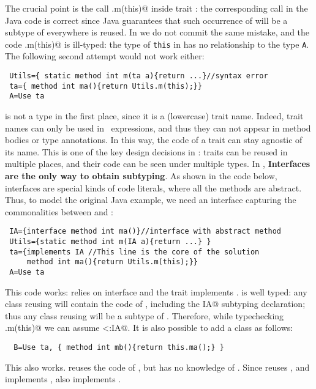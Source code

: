 The crucial point is the call \Q@Utils.m(this)@ inside trait \Q@ta@:
the corresponding call in the Java code is correct since Java guarantees that such occurrence of \Q@this@ will be a subtype of \Q@A@ everywhere is reused.
In \name we do not commit the same mistake, and the code \Q@Utils.m(this)@ is ill-typed:
the type of \lstinline{this} in
\Q@ta@ has no relationship to the type \lstinline{A}.
The following second attempt would not work either:
\saveSpace\saveSpace
\begin{lstlisting}
 Utils={ static method int m(ta a){return ...}//syntax error
 ta={ method int ma(){return Utils.m(this);}}
 A=Use ta
\end{lstlisting}
\saveSpace\saveSpace
\Q@ta@ is not a type in the first place, since it is a (lowercase) trait name.
Indeed, trait names can only be used in \use\ expressions, and thus they can not appear in method bodies or type annotations.
In this way, the code of a trait can stay agnostic of its name. This is one of the key design decisions in \name:
traits can be reused in multiple places, and their code can be seen under multiple types.
In \name, \textbf{Interfaces are the only way to obtain subtyping}. As shown in the code below, interfaces are special kinds of code literals, where all the methods are abstract.
Thus, to model the original Java example, we need an interface
capturing the commonalities between \Q@A@ and \Q@B@:
\saveSpace\saveSpace
\begin{lstlisting}
 IA={interface method int ma()}//interface with abstract method
 Utils={static method int m(IA a){return ...} }
 ta={implements IA //This line is the core of the solution
     method int ma(){return Utils.m(this);}}
 A=Use ta
\end{lstlisting}
\saveSpace\saveSpace
This code works: \Q@Utils@ relies on interface \Q@IA@ and the trait \Q@ta@
implements \Q@IA@.
\Q@ta@ is well typed:
any class reusing \Q@ta@ will contain the code of \Q@ta@,
including the \Q@implements IA@ subtyping declaration; thus any class reusing \Q@ta@ will be a subtype of \Q@IA@. 
Therefore, while typechecking \Q@Utils.m(this)@ we can assume
\Q@this<:IA@.
 It is also possible to add a class \Q@B@ as follows:
\saveSpace\saveSpace
\begin{lstlisting}
  B=Use ta, { method int mb(){return this.ma();} }
\end{lstlisting}
\saveSpace\saveSpace
This also works.  \Q@B@ reuses the code of \Q@ta@, but has no knowledge of \Q@A@.
Since \Q@B@ reuses \Q@ta@, and \Q@ta@ implements \Q@IA@, also \Q@B@ implements \Q@IA@. 

